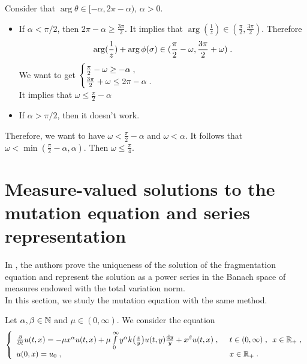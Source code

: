 \documentclass[11pt]{amsart}
\begin{document}
Consider that $\arg \theta \in [-\alpha, 2\pi-\alpha)$, $\alpha > 0$.
\begin{itemize}
    \item If $\alpha < \pi / 2$, then 
    $2\pi - \alpha \geq \frac{3\pi}{2}$. It implies that $\arg(\frac1z) \in (\frac\pi2, \frac{3\pi}{2})$. Therefore
    $$ \arg(\frac1z) + \arg \phi(\sigma) \in (\frac\pi2 - \omega, \frac{3\pi}{2}+\omega)\; .$$
    We want to get 
    $\begin{cases}
        \frac{\pi}{2}-\omega \geq - \alpha \; , \enspace
        \\
        \frac{3\pi}{2}+\omega \leq 2\pi-\alpha \; .
    \end{cases}$ \\
    It implies that $\omega \leq \frac{\pi}{2}-\alpha$
    \item If $\alpha > \pi / 2$, then it doesn't work. 
\end{itemize}
Therefore, we want to have $ \omega < \frac{\pi}{2}-\alpha$ and $\omega < \alpha$.
It follows that $\omega < \min(\frac\pi2 - \alpha, \alpha)$. Then $\omega \leq \frac\pi4$.  


\section{Measure-valued solutions to the mutation equation and series representation}
\label{s:measure_series_repr}

In \cite{doumic2021inverse}, the authors prove the uniqueness of the solution of the fragmentation equation and represent the solution as a power series in the Banach space of measures endowed with the total variation norm. \\

In this section, we study the mutation equation with the same method. 

Let $\alpha, \beta \in \mathbb{N}$ and $\mu \in (0, \infty)$.  
We consider the equation 
\begin{equation}\left\{
    \begin{array}{ll}
	\frac{\partial}{\partial t}u(t,x) = - \mu x^\alpha u(t,x) + \mu \int\limits_{0}^{\infty} y^\alpha k\big( \frac{x}{y}\big)u(t,y) \frac{\mathrm dy}{y} + x^\beta u(t,x) \; , \enspace
	& t \in (0, \infty) \; , \enspace x \in \mathbb{R}_+ \; ,
	\\ u(0, x) = u_0 \; , \enspace
	&  x \in \mathbb{R}_+
	\; .
    \end{array}
	\right.
    \label{eq:DET00.2.4}
\end{equation}
\end{document}
